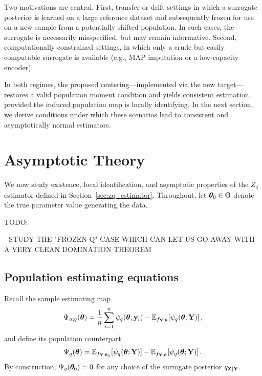 \documentclass[twoside,11pt]{article}
\begin{document}
Two motivations are central. First, transfer or drift settings in which a surrogate posterior is learned on a large reference dataset and subsequently frozen for use on a new sample from a potentially shifted population. In such cases, the surrogate is necessarily misspecified, but may remain informative. Second, computationally constrained settings, in which only a crude but easily computable surrogate is available (e.g., MAP imputation or a low-capacity encoder).

In both regimes, the proposed centering---implemented via the new target---restores a valid population moment condition and yields consistent estimation, provided the induced population map is locally identifying. In the next section, we derive conditions under which these scenarios lead to consistent and asymptotically normal estimators.




\section{Asymptotic Theory}
\label{sec:asymptotics}

We now study existence, local identification, and asymptotic properties of the
$Z_q$ estimator defined in Section~\ref{sec:zq_estimator}.  Throughout, let
${\bm{\theta}}_0\in\Theta$ denote the true parameter value generating the data.



TODO: 

- STUDY THE "FROZEN Q" CASE WHICH CAN LET US GO AWAY WITH A VERY CLEAN DOMINATION THEOREM
\subsection{Population estimating equations}

Recall the sample estimating map
\[
\Psi_{n;q}({\bm{\theta}})
=
\frac{1}{n}\sum_{i=1}^n \psi_q({\bm{\theta}};{\bf y}_i)
-
\mathbb{E}_{f_{{\bf Y};{\bm{\theta}}}}\!\left[\psi_q({\bm{\theta}};{\bf Y})\right],
\]
and define its population counterpart
\[
\Psi_q({\bm{\theta}})
=
\mathbb{E}_{f_{{\bf Y};{\bm{\theta}}_0}}\!\left[\psi_q({\bm{\theta}};{\bf Y})\right]
-
\mathbb{E}_{f_{{\bf Y};{\bm{\theta}}}}\!\left[\psi_q({\bm{\theta}};{\bf Y})\right].
\]
By construction, $\Psi_q({\bm{\theta}}_0)=0$ for any choice of the surrogate posterior
$q_{{\bf Z}\mid{\bf Y}}$.
\end{document}
